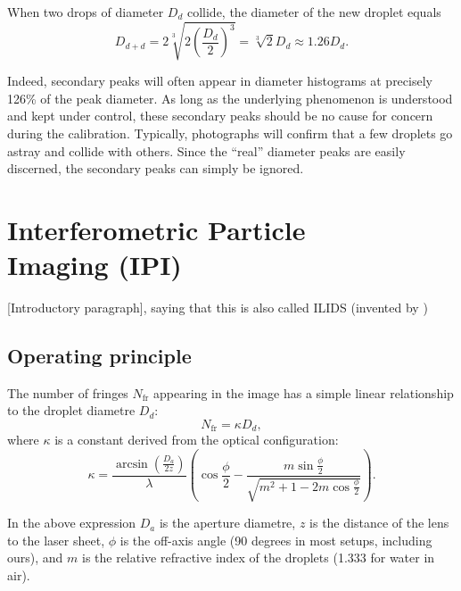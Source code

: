 \documentclass[10pt]{book}
\begin{document}
When two drops of diameter $D_d$ collide, the diameter of the new droplet equals
\begin{equation}
    D_{d+d} = 2\sqrt[3]{2\left(\frac{D_d}{2}\right)^3} = \sqrt[3]{2} D_d \approx
    1.26 D_d.
\end{equation}

Indeed, secondary peaks will often appear in diameter histograms at precisely 126\% of
the peak diameter. As long as the underlying phenomenon is understood and kept
under control, these secondary peaks should be no cause for concern during the
calibration. Typically, photographs will confirm that a few droplets go astray
and collide with others. Since the ``real'' diameter peaks are easily discerned,
the secondary peaks can simply be ignored.

    \chapter[Interferometric Particle Imaging (IPI)]{Interferometric Particle\\ Imaging (IPI)}
    [Introductory paragraph], saying that this is also called ILIDS (invented by
    \citet{Glover95})
\section{Operating principle}
The number of fringes $N_\text{fr}$ appearing in the image has a simple linear relationship to
the droplet diametre $D_d$:
\begin{equation}
    N_\text{fr} = \kappa D_d,
\end{equation}
where $\kappa$ is a constant derived from the optical configuration:
\begin{equation}
    \kappa = \frac{\arcsin\left(\frac{D_a}{2z}\right)}{\lambda}
    \left(\cos\frac{\phi}{2} - \frac{m \sin\frac{\phi}{2}}{\sqrt{m^2 + 1 -
    2m\cos \frac{\phi}{2}}}\right).
    \label{kappa}
\end{equation}

In the above expression $D_a$ is the aperture diametre, $z$ is the distance of
the lens to the laser sheet, $\phi$ is the off-axis angle (90 degrees in most
setups, including ours), and $m$ is the relative refractive index of the
droplets (1.333 for water in air).
\end{document}
